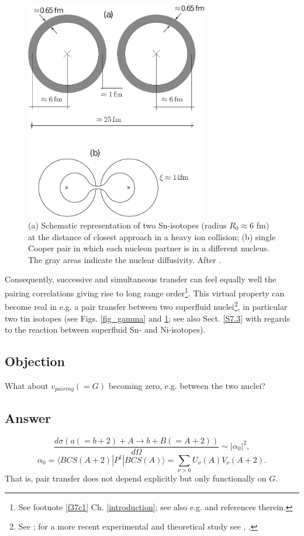 \begin{figure}
\centerline{\includegraphics*[width=8cm,angle=0]{nutshell/figs/fig_1v2.pdf}}
\caption{(a) Schematic representation of two Sn-isotopes (radius $R_0\approx 6$ fm) at the distance of closest approach in a heavy ion collision; (b) single Cooper pair in which each nucleon partner is in a different nucleus. The gray areas indicate the nuclear diffusivity. After \cite{Potel:13b}.}\label{fig_1}
\end{figure}


Consequently, successive and simultaneous transfer can feel equally well the pairing correlations giving rise to long range order\footnote{See footnote \ref{f37c1} Ch. \ref{introduction}; see also e.g. \cite{Potel:17} and references therein.}. This virtual property can become real in e.g. a pair transfer between two superfluid nuclei\footnote{See \cite{Oertzen:13,vonOertzen:01,Weiss:79}; for a more recent experimental and theoretical study see \cite{Montanari:14,Montanari:16}, \cite{Potel:21}.}, in particular two tin isotopes (see Figs. \ref{fig_gamma} and \ref{fig_1}; see also Sect. \ref{S7.3} with regards to the reaction between superfluid Sn- and Ni-isotopes).
\subsection*{Objection}
What about $v_{pairing}(=G)$ becoming zero, e.g. between the two nuclei?
\subsection*{Answer}
\begin{equation}
\frac{d\sigma(a(=b+2)+A\rightarrow b+B(=A+2))}{d\Omega}\sim |\alpha_0|^2,
\end{equation}
\begin{equation}\label{eqtrans_nut1}
\alpha_0=\langle BCS(A+2) |P^\dagger|BCS(A)\rangle=\sum_{\nu>0}U_{\nu}(A)V_{\nu}(A+2).
\end{equation}
That is, pair transfer does not depend explicitly but only functionally on $G$.
